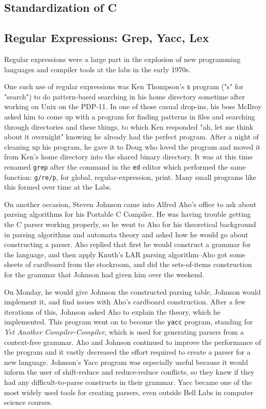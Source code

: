 \subsection{Standardization of C}


\subsection{Regular Expressions: Grep, Yacc, Lex}

Regular expressions were a large part in the explosion of new programming languages
and compiler tools at the labs in the early 1970s.

One such use of regular expressions was Ken Thompson's \texttt{s}
program ("s" for "search") to do pattern-based searching
in his home directory sometime after working on Unix on the PDP-11.
In one of those casual drop-ins, his boss McIlroy asked him to come up with a program for finding
patterns in files and searching through directories and these things, to which Ken responded
"ah, let me think about it overnight" knowing he already had the perfect program.
After a night of cleaning up his program, he gave it to Doug who loved the program
and moved it from Ken's home directory into the shared binary directory.
It was at this time renamed \texttt{grep} after the command in the \texttt{ed} editor
which performed the same function: \texttt{g/re/p}, for global, regular-expression, print.
Many small programs like this formed over time at the Labs.

On another occasion, Steven Johnson came into Alfred Aho's office to ask about
parsing algorithms for his Portable C Compiler. He was having trouble getting the C parser
working properly, so he went to Aho for his theoretical background in parsing algorithms
and automata theory and asked how he would go about constructing a parser.
Aho replied that first he would construct a grammar for the language, and then apply
Knuth's LAR parsing algorithm--Aho got some sheets of cardboard from the stockroom,
and did the sets-of-items construction for the grammar that Johnson had given him
over the weekend.

On Monday, he would give Johnson the constructed parsing table, Johnson would implement it,
and find issues with Aho's cardboard construction. After a few iterations of this, Johnson
asked Aho to explain the theory, which he implemented. This program went on to become the
\texttt{yacc} program, standing for \textit{Yet Another Compiler-Compiler}, which is used
for generating parsers from a context-free grammar.
Aho and Johnson continued to improve the performance of the program and it vastly decreased the
effort required to create a parser for a new language.
Johnson's Yacc program was especially useful because it would inform the user of shift-reduce
and reduce-reduce conflicts, so they knew if they had any difficult-to-parse constructs in their
grammar.
Yacc became one of the most widely used tools for creating parsers, even outside Bell Labs
in computer science courses.

